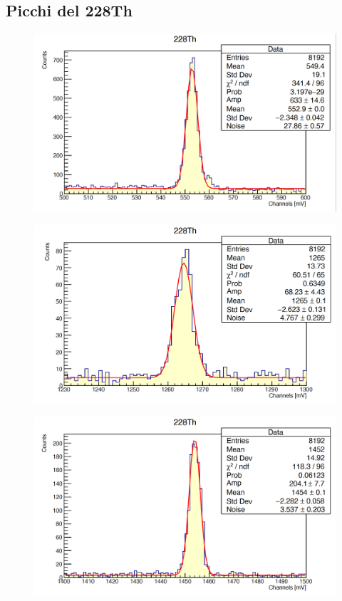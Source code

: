\documentclass[a4paper,10pt]{article}
\begin{document}
\subsection{Picchi del 228Th}
\begin{figure}[H]
    \centering
    \includegraphics[scale=0.45]{appendice/Th1}
\end{figure}
\begin{figure}[H]
    \centering
    \includegraphics[scale=0.45]{appendice/Th2}
\end{figure}
\begin{figure}[H]
    \centering
    \includegraphics[scale=0.45]{appendice/Th3}
\end{figure}
\end{document}
